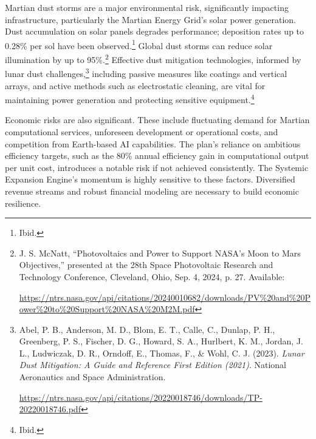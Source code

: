\documentclass[fontsize=10pt, oneside, DIV=calc]{scrartcl}
\begin{document}
\noindent
Martian dust storms are a major environmental risk, significantly impacting infrastructure, particularly the Martian Energy Grid's solar power generation. Dust accumulation on solar panels degrades performance; deposition rates up to 0.28\% per sol have been observed.\footnote{Ibid.} Global dust storms can reduce solar illumination by up to 95\%.\footnote{J. S. McNatt, ``Photovoltaics and Power to Support NASA’s Moon to Mars Objectives,'' presented at the 28th Space Photovoltaic Research and Technology Conference, Cleveland, Ohio, Sep. 4, 2024, p. 27. Available: 







\href{https://ntrs.nasa.gov/api/citations/20240010682/downloads/PV\%20and\%20Power\%20to\%20Support\%20NASA\%20M2M.pdf}\url{https://ntrs.nasa.gov/api/citations/20240010682/downloads/PV\%20and\%20Power\%20to\%20Support\%20NASA\%20M2M.pdf}} Effective dust mitigation technologies, informed by lunar dust challenges,\footnote{Abel, P. B., Anderson, M. D., Blom, E. T., Calle, C., Dunlap, P. H., Greenberg, P. S., Fischer, D. G., Howard, S. A., Hurlbert, K. M., Jordan, J. L., Ludwiczak, D. R., Orndoff, E., Thomas, F., \& Wohl, C. J. (2023). \emph{Lunar Dust Mitigation: A Guide and Reference First Edition (2021)}. National Aeronautics and Space Administration. 







\href{https://ntrs.nasa.gov/api/citations/20220018746/downloads/TP-20220018746.pdf}\url{https://ntrs.nasa.gov/api/citations/20220018746/downloads/TP-20220018746.pdf}} including passive measures like coatings and vertical arrays, and active methods such as electrostatic cleaning, are vital for maintaining power generation and protecting sensitive equipment.\footnote{Ibid.}

\medskip

\noindent
Economic risks are also significant. These include fluctuating demand for Martian computational services, unforeseen development or operational costs, and competition from Earth-based AI capabilities. The plan's reliance on ambitious efficiency targets, such as the 80\% annual efficiency gain in computational output per unit cost, introduces a notable risk if not achieved consistently. The Systemic Expansion Engine's momentum is highly sensitive to these factors. Diversified revenue streams and robust financial modeling are necessary to build economic resilience.
\end{document}
